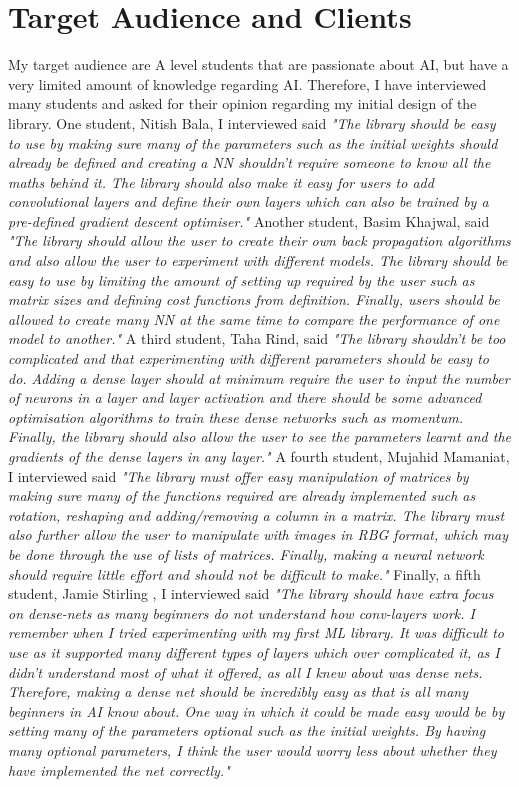 \section{Target Audience and Clients}
My target audience are A level students that are passionate about AI, but have a very limited amount of knowledge regarding AI. Therefore, I have interviewed many students and asked for their opinion regarding my initial design of the library.
\bigbreak
One student, Nitish Bala, I interviewed said \textit{"The library should be easy to use by making sure many of the parameters such as the initial weights should already be defined and creating a NN shouldn't require someone to know all the maths behind it. The library should also make it easy for users to add convolutional layers and define their own layers which can also be trained by a pre-defined gradient descent optimiser."}
\bigbreak
Another student, Basim Khajwal, said \textit{"The library should allow the user to create their own back propagation algorithms and also allow the user to experiment with different models. The library should be easy to use by limiting the amount of setting up required by the user such as matrix sizes and defining cost functions from definition. Finally, users should be allowed to create many NN at the same time to compare the performance of one model to another."}
\bigbreak
A third student, Taha Rind, said \textit{"The library shouldn't be too complicated and that experimenting with different parameters should be easy to do. Adding a dense layer should at minimum require the user to input the number of neurons in a layer and layer activation and there should be some advanced optimisation algorithms to train these dense networks such as momentum. Finally, the library should also allow the user to see the parameters learnt and the gradients of the dense layers in any layer."}
\bigbreak
A fourth student, Mujahid Mamaniat, I interviewed said \textit{"The library must offer easy manipulation of matrices by making sure many of the functions required are already implemented such as rotation, reshaping and adding/removing a column in a matrix. The library must also further allow the user to manipulate with images in RBG format, which may be done through the use of lists of matrices. Finally, making a neural network should require little effort and should not be difficult to make."}
\bigbreak
Finally, a fifth student, Jamie Stirling , I interviewed said
\textit{"The library should have extra focus on dense-nets as many beginners do not understand how conv-layers work. I remember when I tried experimenting with my first ML library. It was difficult to use as it supported many different types of layers which over complicated it, as I didn't understand most of what it offered, as all I knew about was dense nets. Therefore, making a dense net should be incredibly easy as that is all many beginners in AI know about. One way in which it could be made easy would be by setting many of the parameters optional such as the initial weights. By having many optional parameters, I think the user would worry less about whether they have implemented the net correctly."}
